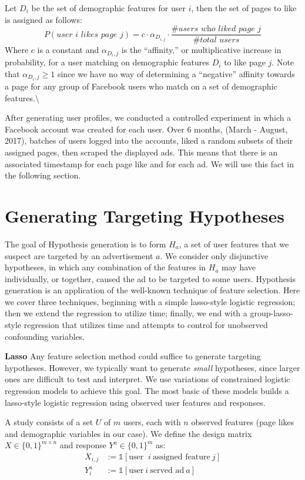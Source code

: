 \documentclass[]{article}
\begin{document}
Let \(D_i\) be the set of demographic features for user \(i\), then the
set of pages to like is assigned as follows: \[
P(\textit{user i likes page j}) = c \cdot \alpha_{D_{i,j}} \cdot \frac{\textit{\# users who liked page j}}{\textit{\# total users}}
\] Where \(c\) is a constant and \(\alpha_{D_i,j}\) is the ``affinity,''
or multiplicative increase in probability, for a user matching on
demographic features \(D_i\) to like page \(j\). Note that
\(\alpha_{D_i,j} \geq 1\) since we have no way of determining a
``negative'' affinity towards a page for any group of Facebook users who
match on a set of demographic features.\textbackslash{}

After generating user profiles, we conducted a controlled experiment in
which a Facebook account was created for each user. Over 6 months,
(March - August, 2017), batches of users logged into the accounts, liked
a random subsets of their assigned pages, then scraped the displayed
ads. This means that there is an associated timestamp for each page like
and for each ad. We will use this fact in the following section.

\hypertarget{hypotheses}{%
\section{Generating Targeting Hypotheses}\label{hypotheses}}

The goal of Hypothesis generation is to form \(H_a\), a set of user
features that we suspect are targeted by an advertisement \(a\). We
consider only disjunctive hypotheses, in which any combination of the
features in \(H_a\) may have individually, or together, caused the ad to
be targeted to some users. Hypothesis generation is an application of
the well-known technique of feature selection. Here we cover three
techniques, beginning with a simple lasso-style logistic regression;
then we extend the regression to utilize time; finally, we end with a
group-lasso-style regression that utilizes time and attempts to control
for unobserved confounding variables.

\textbf{Lasso} Any feature selection method could suffice to generate
targeting hypotheses. However, we typically want to generate
\textit{small} hypotheses, since larger ones are difficult to test and
interpret. We use variations of constrained logistic regression models
to achieve this goal. The most basic of these models builds a
lasso-style logistic regression using observed user features and
responses.

A study consists of a set \(U\) of \(m\) users, each with \(n\) observed
features (page likes and demographic variables in our case). We define
the design matrix \(X \in \{0,1\}^{m \times n}\) and response
\(Y^a \in \{0,1\}^m\) as: \begin{align}
        X_{i,j} &:= \mathbb{1}[\textrm{user } \ i \ \textrm{assigned feature} \ j] \label{eq:x}\\
        Y^a_i &:= \mathbb{1}[\textrm{user} \ i \ \textrm{served ad} \ a]
\end{align}
\end{document}
